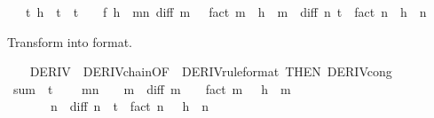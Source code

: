 \begin{isabellebody}
\ \ \ {\isachardoublequoteopen}{\isasymexists}t{\isachardot}{\kern0pt}\ h\ {\isacharless}{\kern0pt}\ t\ {\isasymand}\ t\ {\isacharless}{\kern0pt}\ {}\ {\isasymand}\ f\ h\ {\isacharequal}{\kern0pt}\ {\isacharparenleft}{\kern0pt}{\isasymSum}m{\isacharless}{\kern0pt}n{\isachardot}{\kern0pt}\ diff\ m\ {}\ {\isacharslash}{\kern0pt}\ fact\ m\ {\isacharasterisk}{\kern0pt}\ h\ {\isacharcircum}{\kern0pt}\ m{\isacharparenright}{\kern0pt}\ {\isacharplus}{\kern0pt}\ diff\ n\ t\ {\isacharslash}{\kern0pt}\ fact\ n\ {\isacharasterisk}{\kern0pt}\ h\ {\isacharcircum}{\kern0pt}\ n{\isachardoublequoteclose}\isanewline
%
\isadelimproof
%
\endisadelimproof
%
\isatagproof
{}\isamarkupfalse%
\ {\isacharminus}{\kern0pt}%
\begin{isamarkuptxt}%
Transform  into  format.%
\end{isamarkuptxt}\isamarkuptrue%
\ \ \isamarkupfalse%
\ DERIV{\isacharprime}{\kern0pt}\ {\isacharequal}{\kern0pt}\ DERIV{\isacharunderscore}{\kern0pt}chain{\isacharprime}{\kern0pt}{\isacharbrackleft}{\kern0pt}OF\ {\isacharunderscore}{\kern0pt}\ DERIV{\isacharbrackleft}{\kern0pt}rule{\isacharunderscore}{\kern0pt}format{\isacharbrackright}{\kern0pt}{\isacharcomma}{\kern0pt}\ THEN\ DERIV{\isacharunderscore}{\kern0pt}cong{\isacharbrackright}{\kern0pt}\isanewline
\ \ \isamarkupfalse%
\ {\isacharquery}{\kern0pt}sum\ {\isacharequal}{\kern0pt}\ {\isachardoublequoteopen}{\isasymlambda}t{\isachardot}{\kern0pt}\isanewline
\ \ \ \ {\isacharparenleft}{\kern0pt}{\isasymSum}m{\isacharless}{\kern0pt}n{\isachardot}{\kern0pt}\ {\isacharparenleft}{\kern0pt}{\isacharminus}{\kern0pt}\ {}{\isacharparenright}{\kern0pt}\ {\isacharcircum}{\kern0pt}\ m\ {\isacharasterisk}{\kern0pt}\ diff\ m\ {\isacharparenleft}{\kern0pt}{\isacharminus}{\kern0pt}\ {}{\isacharparenright}{\kern0pt}\ {\isacharslash}{\kern0pt}\ {\isacharparenleft}{\kern0pt}fact\ m{\isacharparenright}{\kern0pt}\ {\isacharasterisk}{\kern0pt}\ {\isacharparenleft}{\kern0pt}{\isacharminus}{\kern0pt}\ h{\isacharparenright}{\kern0pt}\ {\isacharcircum}{\kern0pt}\ m{\isacharparenright}{\kern0pt}\ {\isacharplus}{\kern0pt}\isanewline
\ \ \ \ {\isacharparenleft}{\kern0pt}{\isacharminus}{\kern0pt}\ {}{\isacharparenright}{\kern0pt}\ {\isacharcircum}{\kern0pt}\ n\ {\isacharasterisk}{\kern0pt}\ diff\ n\ {\isacharparenleft}{\kern0pt}{\isacharminus}{\kern0pt}\ t{\isacharparenright}{\kern0pt}\ {\isacharslash}{\kern0pt}\ {\isacharparenleft}{\kern0pt}fact\ n{\isacharparenright}{\kern0pt}\ {\isacharasterisk}{\kern0pt}\ {\isacharparenleft}{\kern0pt}{\isacharminus}{\kern0pt}\ h{\isacharparenright}{\kern0pt}\ {\isacharcircum}{\kern0pt}\ n{\isachardoublequoteclose}\isanewline

\end{isabellebody}
